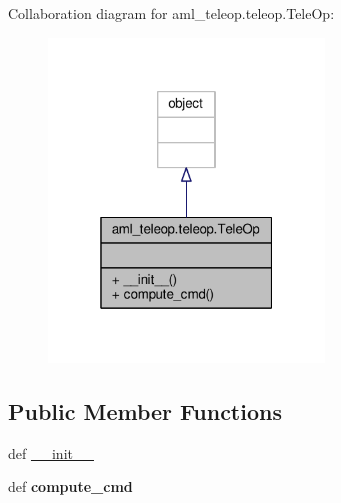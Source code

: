 Collaboration diagram for aml\-\_\-teleop.\-teleop.\-Tele\-Op\-:
\nopagebreak
\begin{figure}[H]
\begin{center}
\leavevmode
\includegraphics[width=208pt]{classaml__teleop_1_1teleop_1_1_tele_op__coll__graph}
\end{center}
\end{figure}
\subsection*{Public Member Functions}
\begin{DoxyCompactItemize}
\item 
def \hyperlink{classaml__teleop_1_1teleop_1_1_tele_op_ab9d5c1b5b6264687c1420944721728de}{\-\_\-\-\_\-init\-\_\-\-\_\-}
\item 
\hypertarget{classaml__teleop_1_1teleop_1_1_tele_op_ae504fb6b0e4cb69866c1aba2268f6763}{def {\bfseries compute\-\_\-cmd}}\label{classaml__teleop_1_1teleop_1_1_tele_op_ae504fb6b0e4cb69866c1aba2268f6763}

\end{DoxyCompactItemize}


